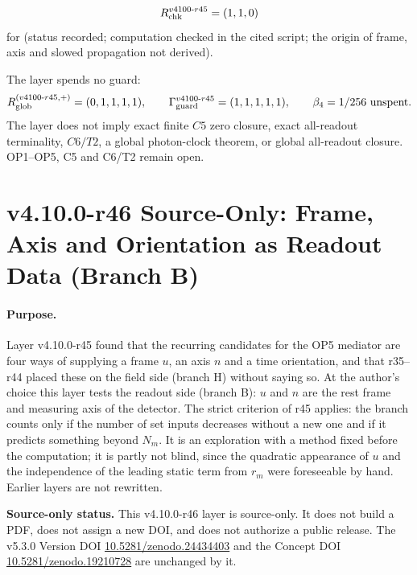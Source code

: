 \[
R_{\rm chk}^{v4100\text{-}r45}=(1,1,0)
\]
for (status recorded; computation checked in the cited script; the origin of frame, axis and slowed propagation not derived).

The layer spends no guard:
\[
R_{\rm glob}^{(v4100\text{-}r45,+)}=(0,1,1,1,1),
\qquad
\Gamma_{\rm guard}^{v4100\text{-}r45}=(1,1,1,1,1),
\qquad
\beta_4=1/256\ \text{unspent}.
\]
The layer does not imply exact finite \(C5\) zero closure, exact all-readout terminality, \(C6/T2\), a global photon-clock theorem,
or global all-readout closure.  OP1--OP5, C5 and C6/T2 remain open.

\clearpage
\section*{v4.10.0-r46 Source-Only: Frame, Axis and Orientation as Readout Data (Branch B)}
\label{sec:v4100-r46-readout-branch}

\paragraph{Purpose.}
Layer v4.10.0-r45 found that the recurring candidates for the OP5 mediator are four ways of supplying a frame \(u\), an axis \(n\) and a time
orientation, and that r35--r44 placed these on the field side (branch H) without saying so.  At the author's choice this layer tests the readout
side (branch B): \(u\) and \(n\) are the rest frame and measuring axis of the detector.  The strict criterion of r45 applies: the branch counts only if the
number of set inputs decreases without a new one and if it predicts something beyond \(N_m\).  It is an exploration with a method fixed before the
computation; it is partly not blind, since the quadratic appearance of \(u\) and the independence of the leading static term from \(r_m\) were
foreseeable by hand.  Earlier layers are not rewritten.

\noindent\textbf{Source-only status.}
This v4.10.0-r46 layer is source-only.  It does not build a PDF, does not assign a new DOI,
and does not authorize a public release.  The v5.3.0 Version DOI
\href{https://doi.org/10.5281/zenodo.24434403}{10.5281/zenodo.24434403} and the Concept DOI
\href{https://doi.org/10.5281/zenodo.19210728}{10.5281/zenodo.19210728} are unchanged by it.

